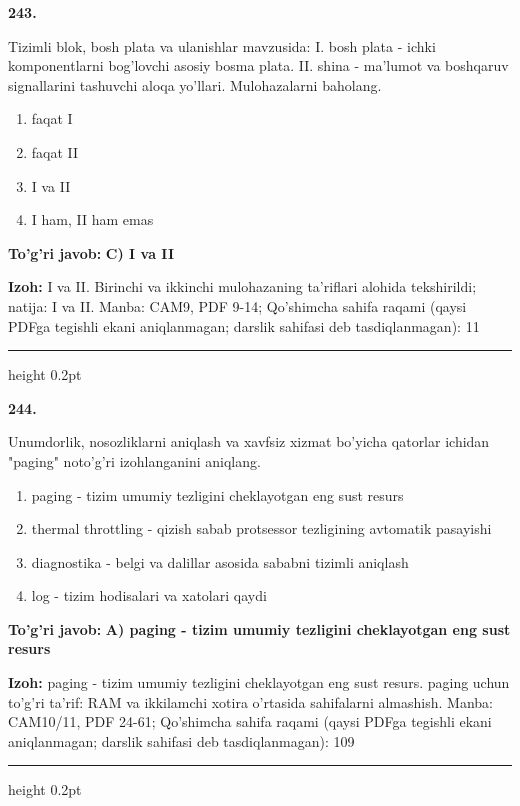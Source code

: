 \documentclass[10pt,a4paper]{article}
\begin{document}
{\bfseries\sffamily\color{ink} 243.}
\par
Tizimli blok, bosh plata va ulanishlar mavzusida: I. bosh plata - ichki komponentlarni bog'lovchi asosiy bosma plata. II. shina - ma'lumot va boshqaruv signallarini tashuvchi aloqa yo'llari. Mulohazalarni baholang.
\begin{enumerate}[label=\Alph*),leftmargin=9mm]
\item faqat I
\item faqat II
\item I va II
\item I ham, II ham emas
\end{enumerate}
\begin{tcolorbox}[enhanced,breakable,colback=teal!4,colframe=teal!60!black,boxrule=0.45pt,arc=1.2mm,left=2.7mm,right=2.7mm,top=1.8mm,bottom=1.8mm,before skip=2mm,after skip=2mm]
{\bfseries\sffamily\color{teal}To'g'ri javob:} \textbf{C) I va II}
\par\smallskip
{\bfseries Izoh:} I va II. Birinchi va ikkinchi mulohazaning ta'riflari alohida tekshirildi; natija: I va II. Manba: CAM9, PDF 9-14; Qo'shimcha sahifa raqami (qaysi PDFga tegishli ekani aniqlanmagan; darslik sahifasi deb tasdiqlanmagan): 11
\end{tcolorbox}
\vspace{2mm}\hrule height 0.2pt\vspace{3mm}

{\bfseries\sffamily\color{ink} 244.}
\par
Unumdorlik, nosozliklarni aniqlash va xavfsiz xizmat bo'yicha qatorlar ichidan "paging" noto'g'ri izohlanganini aniqlang.
\begin{enumerate}[label=\Alph*),leftmargin=9mm]
\item paging - tizim umumiy tezligini cheklayotgan eng sust resurs
\item thermal throttling - qizish sabab protsessor tezligining avtomatik pasayishi
\item diagnostika - belgi va dalillar asosida sababni tizimli aniqlash
\item log - tizim hodisalari va xatolari qaydi
\end{enumerate}
\begin{tcolorbox}[enhanced,breakable,colback=teal!4,colframe=teal!60!black,boxrule=0.45pt,arc=1.2mm,left=2.7mm,right=2.7mm,top=1.8mm,bottom=1.8mm,before skip=2mm,after skip=2mm]
{\bfseries\sffamily\color{teal}To'g'ri javob:} \textbf{A) paging - tizim umumiy tezligini cheklayotgan eng sust resurs}
\par\smallskip
{\bfseries Izoh:} paging - tizim umumiy tezligini cheklayotgan eng sust resurs. paging uchun to'g'ri ta'rif: RAM va ikkilamchi xotira o'rtasida sahifalarni almashish. Manba: CAM10/11, PDF 24-61; Qo'shimcha sahifa raqami (qaysi PDFga tegishli ekani aniqlanmagan; darslik sahifasi deb tasdiqlanmagan): 109
\end{tcolorbox}
\vspace{2mm}\hrule height 0.2pt\vspace{3mm}
\end{document}
